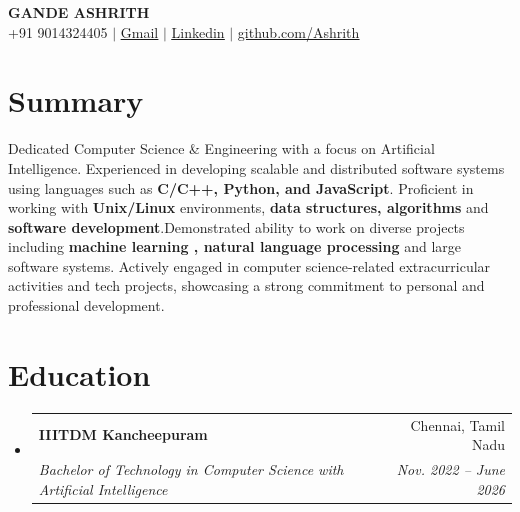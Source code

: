 \documentclass[letterpaper,11pt]{article}
\makeatletter
\newcommand{\resumeSubheading}[4]{
  \vspace{-2pt}\item
    \begin{tabular*}{0.97\textwidth}[t]{l@{\extracolsep{\fill}}r}
      \textbf{#1} & #2 \\
      \textit{\small#3} & \textit{\small #4} \\
    \end{tabular*}\vspace{-7pt}
}
\newcommand{\resumeSubHeadingListStart}{\begin{itemize}[leftmargin=0.15in, label={}]}
\newcommand{\resumeSubHeadingListEnd}{\end{itemize}}
\makeatother
\begin{document}

\begin{center}
    \textbf{\Huge \scshape GANDE ASHRITH} \\ \vspace{1pt}
    \small +91 9014324405 $|$ \href{mailto:ashrith0629@gmail.com}{\underline{Gmail}} $|$ 
    \href{https://www.linkedin.com/in/ashrith-gande-658773291}{\underline{Linkedin}} $|$
    \href{https://github.com/Ashrithiiitdm}{\underline{github.com/Ashrith}}
\end{center}


\section{Summary}
\vspace{5pt}
    Dedicated Computer Science & Engineering with a focus on Artificial Intelligence. Experienced in developing scalable and distributed software systems using languages such as \textbf{C/C++, Python, and JavaScript}. Proficient in working with \textbf{Unix/Linux} environments, \textbf{data structures, algorithms} and \textbf{software development}.Demonstrated ability to work on diverse projects including \textbf{machine learning , natural language processing} and large software systems. Actively engaged in computer science-related extracurricular activities and tech projects, showcasing a strong commitment to personal and professional development.



\section{Education}
  \resumeSubHeadingListStart
    \resumeSubheading
      {IIITDM Kancheepuram}{Chennai, Tamil Nadu}
      {Bachelor of Technology in Computer Science with Artificial Intelligence}{Nov. 2022 -- June 2026}
  \resumeSubHeadingListEnd


\end{document}
